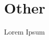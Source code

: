 \documentclass[tom-ari]{subfile}
\begin{document}
	
	\chapter{Other}
	
	Lorem Ipsum
	
	\lipsum[4]
	
\end{document}

